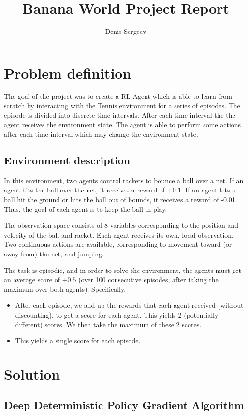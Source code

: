 \documentclass{report}
\begin{document}
\title{Banana World Project Report}
\author{Denis Sergeev}


\section*{Problem definition}

The goal of the project was to create a RL Agent which is able to learn from scratch by interacting with the Tennis environment for a series of episodes. The episode is divided into discrete time intervals. After each time interval the the agent receives the environment state. The agent is able to perform some actions after each time interval which may change the environment state.

\subsection*{Environment description}

In this environment, two agents control rackets to bounce a ball over a net. If an agent hits the
ball over the net, it receives a reward of \(+0.1\). If an agent lets a ball hit the ground or hits the ball out of bounds, it receives a reward of -0.01. Thus, the goal of each agent is to keep the ball in play.

The observation space consists of 8 variables corresponding to the position and velocity of the
ball and racket. Each agent receives its own, local observation. Two continuous actions are available, corresponding to movement toward (or away from) the net, and jumping.

The task is episodic, and in order to solve the environment, the agents must get an average score of \(+0.5\) (over 100 consecutive episodes, after taking the maximum over both agents). Specifically,

\begin{itemize}
\item After each episode, we add up the rewards that each agent received (without discounting), to get a score
for each agent. This yields 2 (potentially different) scores. We then take the maximum of these 2 scores.
\item This yields a single score for each episode.
\end{itemize}


\section*{Solution}
\subsection*{Deep Deterministic Policy Gradient Algorithm}
\end{document}
